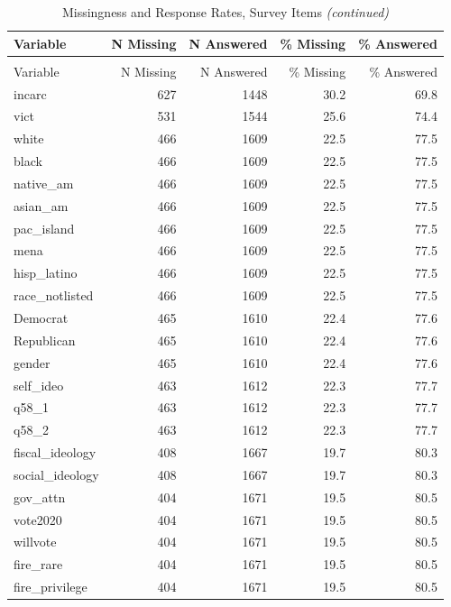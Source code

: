 \begingroup\fontsize{9}{11}\selectfont

\begin{longtable}[t]{lrrrr}
\caption{\label{tab:tab:used_var_missingness1}Missingness and Response Rates, Survey Items}\\
\toprule
Variable & N Missing & N Answered & \% Missing & \% Answered\\
\midrule
\endfirsthead
\caption[]{Missingness and Response Rates, Survey Items \textit{(continued)}}\\
\toprule
Variable & N Missing & N Answered & \% Missing & \% Answered\\
\midrule
\endhead

\endfoot
\bottomrule
\endlastfoot
incarc & 627 & 1448 & 30.2 & 69.8\\
vict & 531 & 1544 & 25.6 & 74.4\\
white & 466 & 1609 & 22.5 & 77.5\\
black & 466 & 1609 & 22.5 & 77.5\\
native\_am & 466 & 1609 & 22.5 & 77.5\\
\addlinespace
asian\_am & 466 & 1609 & 22.5 & 77.5\\
pac\_island & 466 & 1609 & 22.5 & 77.5\\
mena & 466 & 1609 & 22.5 & 77.5\\
hisp\_latino & 466 & 1609 & 22.5 & 77.5\\
race\_notlisted & 466 & 1609 & 22.5 & 77.5\\
\addlinespace
Democrat & 465 & 1610 & 22.4 & 77.6\\
Republican & 465 & 1610 & 22.4 & 77.6\\
gender & 465 & 1610 & 22.4 & 77.6\\
self\_ideo & 463 & 1612 & 22.3 & 77.7\\
q58\_1 & 463 & 1612 & 22.3 & 77.7\\
\addlinespace
q58\_2 & 463 & 1612 & 22.3 & 77.7\\
fiscal\_ideology & 408 & 1667 & 19.7 & 80.3\\
social\_ideology & 408 & 1667 & 19.7 & 80.3\\
gov\_attn & 404 & 1671 & 19.5 & 80.5\\
vote2020 & 404 & 1671 & 19.5 & 80.5\\
\addlinespace
willvote & 404 & 1671 & 19.5 & 80.5\\
fire\_rare & 404 & 1671 & 19.5 & 80.5\\
fire\_privilege & 404 & 1671 & 19.5 & 80.5\\

\end{longtable}
